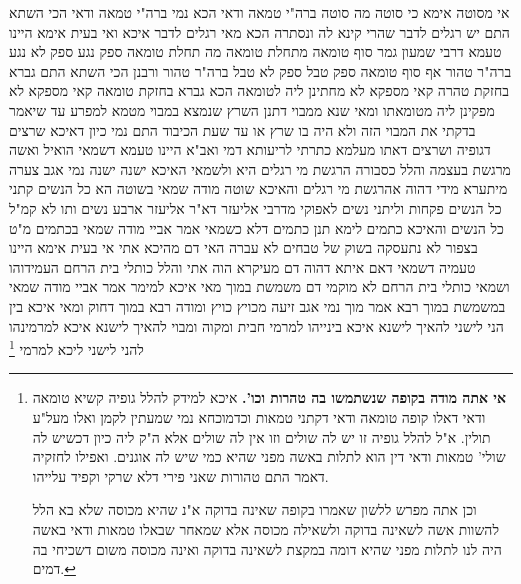 \documentclass[12pt, openany]{book}
\newcommand{\footnotecomment}[1]{\footnote{#1}}
\newcommand{\commenta}[1]{\footnotecomment{#1}}
\begin{document}
{אי מסוטה אימא כי סוטה מה סוטה ברה"י טמאה ודאי  הכא נמי  ברה"י טמאה ודאי
הכי השתא התם יש רגלים לדבר שהרי קינא לה ונסתרה  הכא מאי רגלים לדבר איכא 
ואי בעית אימא היינו טעמא דרבי שמעון  גמר סוף טומאה מתחלת טומאה 
מה תחלת טומאה ספק נגע ספק לא נגע ברה"ר טהור אף סוף טומאה ספק טבל ספק לא טבל ברה"ר טהור 
ורבנן הכי השתא  התם גברא בחזקת טהרה קאי מספקא לא מחתינן ליה לטומאה  הכא גברא בחזקת טומאה קאי מספקא לא מפקינן ליה מטומאתו 
ומאי שנא ממבוי  דתנן  השרץ שנמצא במבוי מטמא למפרע עד שיאמר בדקתי את המבוי הזה ולא היה בו שרץ או עד שעת הכיבוד 
התם נמי כיון דאיכא שרצים דגופיה ושרצים דאתו מעלמא כתרתי לריעותא דמי 
ואב"א היינו טעמא דשמאי  הואיל ואשה מרגשת בעצמה  והלל כסבורה הרגשת מי רגלים היא 
ולשמאי האיכא ישנה  ישנה נמי אגב צערה מיתערא מידי דהוה אהרגשת מי רגלים 
והאיכא שוטה  מודה שמאי בשוטה  הא כל הנשים קתני  כל הנשים פקחות 
וליתני נשים  לאפוקי מדרבי אליעזר דא"ר אליעזר  ארבע נשים ותו לא  קמ"ל כל הנשים 
והאיכא כתמים לימא תנן כתמים דלא כשמאי  אמר אביי  מודה שמאי בכתמים מ"ט בצפור לא נתעסקה בשוק של טבחים לא עברה האי דם מהיכא אתי 
אי בעית אימא היינו טעמיה דשמאי  דאם איתא דהוה דם מעיקרא הוה אתי  והלל כותלי בית הרחם העמידוהו  ושמאי כותלי בית הרחם לא מוקמי דם 
משמשת במוך מאי איכא למימר  אמר אביי  מודה שמאי במשמשת במוך 
רבא אמר  מוך נמי אגב זיעה מכויץ כויץ  ומודה רבא במוך דחוק 
ומאי איכא בין הני לישני להאיך לישנא
איכא בינייהו  למרמי חבית ומקוה ומבוי  להאיך לישנא איכא למרמינהו להני לישני ליכא למרמי 
\commenta{\textbf{אי אתה מודה בקופה שנשתמשו בה טהרות וכו'.}  איכא למידק להלל גופיה קשיא טומאה ודאי דאלו קופה טומאה ודאי דקתני טמאות וכדמוכחא נמי שמעתין לקמן ואלו מעל"ע תולין. א"ל להלל גופיה זו יש לה שולים וזו אין לה שולים אלא ה"ק ליה כיון דכשיש לה שולי' טמאות ודאי דין הוא לתלות באשה מפני שהיא כמי שיש לה אוגנים. ואפילו לחזקיה דאמר התם טהורות שאני פירי דלא שרקי וקפיד עלייהו.\par וכן אתה מפרש ללשון שאמרו בקופה שאינה בדוקה א"נ שהיא מכוסה שלא בא הלל להשוות אשה לשאינה בדוקה ולשאילה מכוסה אלא שמאחר שבאלו טמאות ודאי באשה היה לנו לתלות מפני שהיא דומה במקצת לשאינה בדוקה ואינה מכוסה משום דשכיחי בה דמים. }

}
\end{document}

